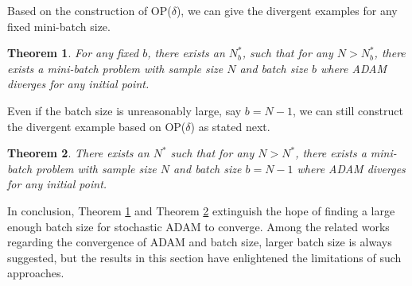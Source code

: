 \documentclass[twoside]{article}
\newtheorem{theorem}{Theorem}
\begin{document}
Based on the construction of OP($\delta$), we can give the divergent examples for any fixed mini-batch size.
\begin{theorem}
\label{thm:DivFixb}
For any fixed $b$, there exists an $N^*_b$, such that for any $N>N^*_b$, there exists a mini-batch problem with sample size $N$ and batch size $b$ where ADAM diverges for any initial point.
\end{theorem}
Even if the batch size is unreasonably large, say $b=N-1$, we can still construct the divergent example based on OP($\delta$) as stated next.
\begin{theorem}
\label{thm:DivLargeb}
There exists an $N^*$ such that for any $N>N^*$, there exists a mini-batch problem with sample size $N$ and batch size $b=N-1$ where ADAM diverges for any initial point.
\end{theorem}
In conclusion, Theorem \ref{thm:DivFixb} and Theorem \ref{thm:DivLargeb} extinguish the hope of finding a large enough batch size for stochastic ADAM to converge. Among the related works regarding the convergence of ADAM and batch size, larger batch size is always suggested, but the results in this section have enlightened the limitations of such approaches.
\end{document}
